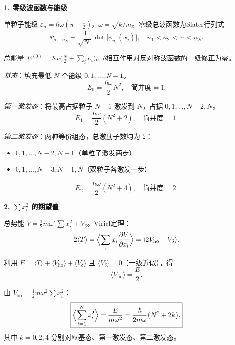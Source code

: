 \begin{derivationbox}[标准解题过程]
\textbf{1. 零级波函数与能级}

单粒子能级 $\varepsilon_n=\hbar\omega(n+\frac12)$，$\omega=\sqrt{k/m}$。零级总波函数为Slater行列式
\[
\Psi_{n_1\cdots n_N}=\frac{1}{\sqrt{N!}}\det\bigl[\psi_{n_i}(x_j)\bigr],\quad n_1<n_2<\cdots<n_N.
\]

总能量 $E^{(0)}=\hbar\omega\bigl(\frac{N}{2}+\sum_i n_i\bigr)$。$\delta$相互作用对反对称波函数的一级修正为零。

\textit{基态}：填充最低 $N$ 个能级 $0,1,\ldots,N-1$。
\begin{equation}
\boxed{E_0=\frac{\hbar\omega}{2}N^2,\quad\text{简并度}=1.}
\end{equation}

\textit{第一激发态}：将最高占据粒子 $N-1$ 激发到 $N$，占据 $0,1,\ldots,N-2,N$。
\begin{equation}
\boxed{E_1=\frac{\hbar\omega}{2}(N^2+2),\quad\text{简并度}=1.}
\end{equation}

\textit{第二激发态}：两种等价组态，总激励子数均为 $2$：
\begin{itemize}
    \item $0,1,\ldots,N-2,N+1$（单粒子激发两步）
    \item $0,1,\ldots,N-3,N-1,N$（双粒子各激发一步）
\end{itemize}
\begin{equation}
\boxed{E_2=\frac{\hbar\omega}{2}(N^2+4),\quad\text{简并度}=2.}
\end{equation}

\textbf{2. $\sum x_i^2$ 的期望值}

总势能 $V=\frac12m\omega^2\sum x_i^2+V_\delta$。Virial定理：
\[
2\langle T\rangle=\Bigl\langle\sum_i x_i\frac{\partial V}{\partial x_i}\Bigr\rangle=\langle2V_{\text{ho}}-V_\delta\rangle.
\]

利用 $E=\langle T\rangle+\langle V_{\text{ho}}\rangle+\langle V_\delta\rangle$ 且 $\langle V_\delta\rangle=0$（一级近似），得
\[
\langle V_{\text{ho}}\rangle=\frac{E}{2}.
\]

由 $V_{\text{ho}}=\frac12m\omega^2\sum x_i^2$：
\begin{equation}
\boxed{\Bigl\langle\sum_{i=1}^N x_i^2\Bigr\rangle=\frac{E}{m\omega^2}=\frac{\hbar}{2m\omega}\bigl(N^2+2k\bigr),}
\end{equation}
其中 $k=0,2,4$ 分别对应基态、第一激发态、第二激发态。
\end{derivationbox}

